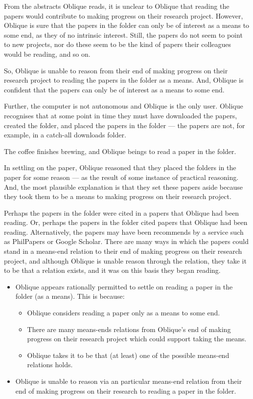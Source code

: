 \documentclass[10pt]{article}
\newcommand{\hozlinedash}[0]{%
  \noindent\hdashrule[0.5ex][c]{\textwidth}{.1pt}{2.5pt}
}
\begin{document}
From the abstracts Oblique reads, it is unclear to Oblique that reading the papers would contribute to making progress on their research project.
However, Oblique is sure that the papers in the folder can only be of interest as a means to some end, as they of no intrinsic interest.
Still, the papers do not seem to point to new projects, nor do these seem to be the kind of papers their colleagues would be reading, and so on.

So, Oblique is unable to reason from their end of making progress on their research project to reading the papers in the folder as a means.
And, Oblique is confident that the papers can only be of interest as a means to some end.

Further, the computer is not autonomous and Oblique is the only user.
Oblique recognises that at some point in time they must have downloaded the papers, created the folder, and placed the papers in the folder --- the papers are not, for example, in a catch-all downloads folder.

The coffee finishes brewing, and Oblique beings to read a paper in the folder.

In settling on the paper, Oblique reasoned that they placed the folders in the paper for some reason --- as the result of some instance of practical reasoning.
And, the most plausible explanation is that they set these papers aside because they took them to be a means to making progress on their research project.

Perhaps the papers in the folder were cited in a papers that Oblique had been reading.
Or, perhaps the papers in the folder cited papers that Oblique had been reading.
Alternatively, the papers may have been recommends by a service such as PhilPapers or Google Scholar.
There are many ways in which the papers could stand in a means-end relation to their end of making progress on their research project, and although Oblique is unable reason through the relation, they take it to be that a relation exists, and it was on this basis they began reading.

\hozlinedash

\begin{itemize}
\item Oblique appears rationally permitted to settle on reading a paper in the folder (as a means).
  This is because:
  \begin{itemize}
  \item Oblique considers reading a paper only as a means to some end.
  \item There are many means-ends relations from Oblique's end of making progress on their research project which could support taking the means.
  \item Oblique takes it to be that (at least) one of the possible means-end relations holds.
  \end{itemize}
\item Oblique is unable to reason via an particular means-end relation from their end of making progress on their research to reading a paper in the folder.
\end{itemize}
\end{document}
